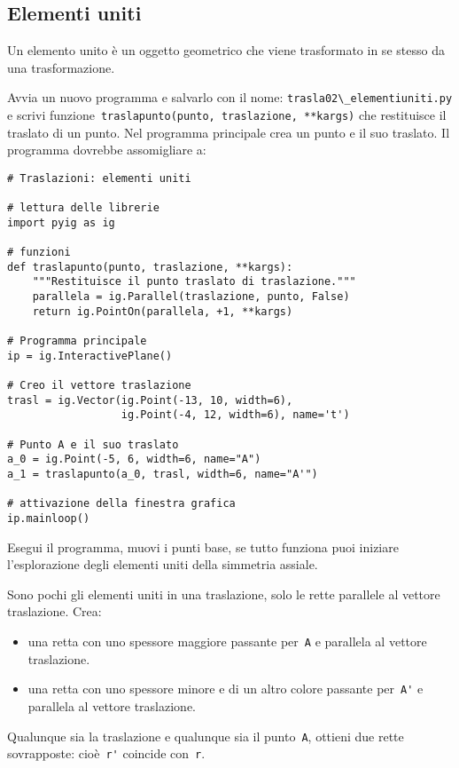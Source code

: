 \subsection{Elementi uniti}

Un elemento unito è un oggetto geometrico che viene trasformato in se stesso
da una trasformazione.

Avvia un nuovo programma e salvarlo con il nome: 
\lstinline{trasla02\_elementiuniti.py}
e scrivi  funzione~\lstinline{traslapunto(punto, traslazione, **kargs)}
che restituisce il traslato di un punto.
Nel programma principale crea un punto e il suo traslato.
Il programma dovrebbe assomigliare a:

\begin{lstlisting}
# Traslazioni: elementi uniti

# lettura delle librerie
import pyig as ig

# funzioni
def traslapunto(punto, traslazione, **kargs):
    """Restituisce il punto traslato di traslazione."""
    parallela = ig.Parallel(traslazione, punto, False)
    return ig.PointOn(parallela, +1, **kargs)

# Programma principale
ip = ig.InteractivePlane()

# Creo il vettore traslazione
trasl = ig.Vector(ig.Point(-13, 10, width=6),
                  ig.Point(-4, 12, width=6), name='t')

# Punto A e il suo traslato
a_0 = ig.Point(-5, 6, width=6, name="A")
a_1 = traslapunto(a_0, trasl, width=6, name="A'")

# attivazione della finestra grafica
ip.mainloop()
\end{lstlisting}

Esegui il programma, muovi i punti base, se tutto funziona puoi iniziare
l'esplorazione degli elementi uniti della simmetria assiale.

Sono pochi gli elementi uniti in una traslazione, solo le rette parallele
al vettore traslazione. Crea:
\begin{itemize}
\item una retta con uno spessore maggiore passante
per~\lstinline{A} e parallela al vettore traslazione.
\item una retta con uno spessore minore e di un altro colore passante
per~\lstinline{A'} e parallela al vettore traslazione.

\end{itemize}

Qualunque sia la traslazione e qualunque sia il punto~\lstinline{A},
ottieni due rette sovrapposte: cioè~\lstinline{r'} coincide con~\lstinline{r}.

